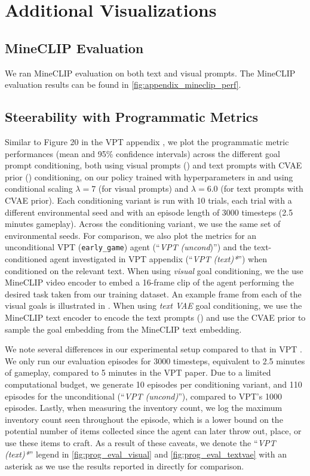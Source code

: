 \section{Additional Visualizations}
\label{appendix:additional_vis}
\subsection{MineCLIP Evaluation}
We ran MineCLIP evaluation on both text and visual prompts. The MineCLIP evaluation results can be found in \autoref{fig:appendix_mineclip_perf}.

\subsection{Steerability with Programmatic Metrics}
Similar to Figure 20 in the VPT appendix \citep{baker2022vpt}, we plot the programmatic metric performances (mean and 95\% confidence intervals) across the different goal prompt conditioning, both using visual prompts () and text prompts with CVAE prior () conditioning, on our policy trained with hyperparameters in  and using conditional scaling $\lambda=7$ (for visual prompts) and $\lambda=6.0$ (for text prompts with CVAE prior). Each conditioning variant is run with 10 trials, each trial with a different environmental seed and with an episode length of 3000 timesteps (2.5 minutes gameplay). Across the conditioning variant, we use the same set of environmental seeds. For comparison, we also plot the metrics for an unconditional VPT (\texttt{early\_game}) agent (``\textit{VPT (uncond})'') and the text-conditioned agent investigated in VPT appendix \citep{baker2022vpt} (``\textit{VPT (text)*}'') when conditioned on the relevant text. When using \textit{visual} goal conditioning, we the use MineCLIP video encoder to embed a 16-frame clip of the agent performing the desired task taken from our training dataset. An example frame from each of the visual goals is illustrated in . When using \textit{text VAE} goal conditioning, we use the MineCLIP text encoder to encode the text prompts () and use the CVAE prior to sample the goal embedding from the MineCLIP text embedding. 

We note several differences in our experimental setup compared to that in VPT \citep{baker2022vpt}. We only run our evaluation episodes for 3000 timesteps, equivalent to 2.5 minutes of gameplay, compared to 5 minutes in the VPT paper. Due to a limited computational budget, we generate 10 episodes per conditioning variant, and 110 episodes for the unconditional (``\textit{VPT (uncond)}''), compared to VPT's 1000 episodes. Lastly, when measuring the inventory count, we log the maximum inventory count seen throughout the episode, which is a lower bound on the potential number of items collected since the agent can later throw out, place, or use these items to craft. As a result of these caveats, we denote the ``\textit{VPT (text)*}'' legend in \autoref{fig:prog_eval_visual} and \autoref{fig:prog_eval_textvae} with an asterisk as we use the results reported in \citep{baker2022vpt} directly for comparison.

